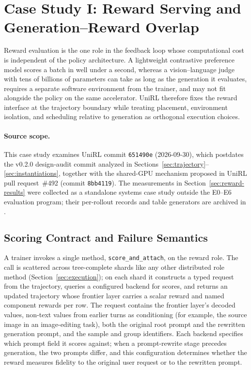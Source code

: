 

\section{Case Study I: Reward Serving and Generation--Reward Overlap}
\label{sec:reward}

Reward evaluation is the one role in the feedback loop whose computational cost is independent of the policy architecture.
A lightweight contrastive preference model scores a batch in well under a second, whereas a vision--language judge with tens of billions of parameters can take as long as the generation it evaluates, requires a separate software environment from the trainer, and may not fit alongside the policy on the same accelerator.
UniRL therefore fixes the reward interface at the trajectory boundary while treating placement, environment isolation, and scheduling relative to generation as orthogonal execution choices.

\paragraph{Source scope.}
This case study examines UniRL commit \texttt{651490e} (2026-09-30), which postdates the v0.2.0 design-audit commit analyzed in Sections~\ref{sec:trajectory}--\ref{sec:instantiations}, together with the shared-GPU mechanism proposed in UniRL pull request~\#492 (commit \texttt{8bb4119}).
The measurements in Section~\ref{sec:reward-results} were collected as a standalone systems case study outside the E0--E6 evaluation program; their per-rollout records and table generators are archived in .

\subsection{Scoring Contract and Failure Semantics}
\label{sec:reward-contract}

A trainer invokes a single method, \texttt{score\_and\_attach}, on the reward role.
The call is scattered across tree-complete shards like any other distributed role method (Section~\ref{sec:execution}); on each shard it constructs a typed request from the trajectory, queries a configured backend for scores, and returns an updated trajectory whose frontier layer carries a scalar reward and named component rewards per row.
The request contains the frontier layer's decoded values, non-text values from earlier turns as conditioning (for example, the source image in an image-editing task), both the original root prompt and the rewritten generation prompt, and the sample and group identifiers.
Each backend specifies which prompt field it scores against; when a prompt-rewrite stage precedes generation, the two prompts differ, and this configuration determines whether the reward measures fidelity to the original user request or to the rewritten prompt.

